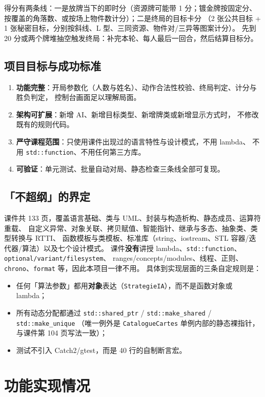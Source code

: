 \documentclass[11pt,a4paper]{ctexart}
\newcommand{\cl}[1]{\texttt{#1}}
\begin{document}
得分有两条线：一是放牌当下的即时分（资源牌可能带 1 分；镀金牌按固定分、
按覆盖的角落数、或按场上物件数计分）；二是终局的目标卡分
（2 张公共目标 + 1 张秘密目标，分别按斜线、L 型、三同资源、物件对/三异等图案计分）。
先到 20 分或两个牌堆抽空触发终局：补完本轮、每人最后一回合，然后结算目标分。

\subsection{项目目标与成功标准}
\begin{enumerate}
\item \textbf{功能完整}：开局参数化（人数与姓名）、动作合法性校验、终局判定、计分与胜负判定，
      控制台画面足以理解局面。
\item \textbf{架构可扩展}：新增 AI、新增目标类型、新增牌类或新增显示方式时，
      不修改既有的规则代码。
\item \textbf{严守课程范围}：只使用课件出现过的语言特性与设计模式，不用 lambda、
      不用 \cl{std::function}、不用任何第三方库。
\item \textbf{可验证}：单元测试、批量自动对局、静态检查三条线全部可复现。
\end{enumerate}

\subsection{「不超纲」的界定}
课件共 133 页，覆盖语言基础、类与 UML、封装与构造析构、静态成员、运算符重载、
自定义异常、对象关联、拷贝赋值、智能指针、继承与多态、抽象类、类型转换与 RTTI、
函数模板与类模板、标准库（string、iostream、STL 容器/迭代器/算法）以及七个设计模式。
课件\textbf{没有}讲授 lambda、\cl{std::function}、\cl{optional/variant/filesystem}、
ranges/concepts/modules、线程、正则、\cl{chrono}、\cl{format} 等，因此本项目一律不用。
具体到实现层面的三条自定规则是：
\begin{itemize}
\item 任何「算法参数」都用\textbf{对象}表达（\cl{StrategieIA}），而不是函数对象或 lambda；
\item 所有动态分配都通过 \cl{std::shared\_ptr} / \cl{std::make\_shared} / \cl{std::make\_unique}
      （唯一例外是 \cl{CatalogueCartes} 单例内部的静态裸指针，与课件第 104 页写法一致）；
\item 测试不引入 Catch2/gtest，而是 40 行的自制断言宏。
\end{itemize}

\section{功能实现情况}
\end{document}
